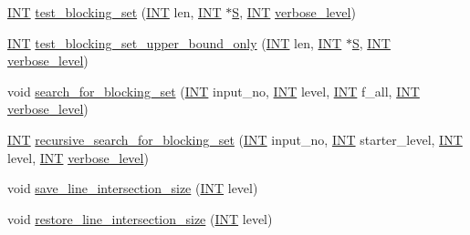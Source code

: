 \begin{DoxyCompactItemize}
\item 
\mbox{\hyperlink{galois_8h_a09fddde158a3a20bd2dcadb609de11dc}{I\+NT}} \mbox{\hyperlink{classsearch__blocking__set_a40f8e6200ebf133284aef437dfc4204e}{test\+\_\+blocking\+\_\+set}} (\mbox{\hyperlink{galois_8h_a09fddde158a3a20bd2dcadb609de11dc}{I\+NT}} len, \mbox{\hyperlink{galois_8h_a09fddde158a3a20bd2dcadb609de11dc}{I\+NT}} $\ast$\mbox{\hyperlink{simeon_8_c_adab47f8243f1b5a2c31df2535d6b37d0}{S}}, \mbox{\hyperlink{galois_8h_a09fddde158a3a20bd2dcadb609de11dc}{I\+NT}} \mbox{\hyperlink{simeon_8_c_a818073fbcc2f439e7c56952f67386122}{verbose\+\_\+level}})
\item 
\mbox{\hyperlink{galois_8h_a09fddde158a3a20bd2dcadb609de11dc}{I\+NT}} \mbox{\hyperlink{classsearch__blocking__set_ae1ec331b4fa4715c79a22bac0a71f146}{test\+\_\+blocking\+\_\+set\+\_\+upper\+\_\+bound\+\_\+only}} (\mbox{\hyperlink{galois_8h_a09fddde158a3a20bd2dcadb609de11dc}{I\+NT}} len, \mbox{\hyperlink{galois_8h_a09fddde158a3a20bd2dcadb609de11dc}{I\+NT}} $\ast$\mbox{\hyperlink{simeon_8_c_adab47f8243f1b5a2c31df2535d6b37d0}{S}}, \mbox{\hyperlink{galois_8h_a09fddde158a3a20bd2dcadb609de11dc}{I\+NT}} \mbox{\hyperlink{simeon_8_c_a818073fbcc2f439e7c56952f67386122}{verbose\+\_\+level}})
\item 
void \mbox{\hyperlink{classsearch__blocking__set_aea252e95af01eb415908fafbe1875a52}{search\+\_\+for\+\_\+blocking\+\_\+set}} (\mbox{\hyperlink{galois_8h_a09fddde158a3a20bd2dcadb609de11dc}{I\+NT}} input\+\_\+no, \mbox{\hyperlink{galois_8h_a09fddde158a3a20bd2dcadb609de11dc}{I\+NT}} level, \mbox{\hyperlink{galois_8h_a09fddde158a3a20bd2dcadb609de11dc}{I\+NT}} f\+\_\+all, \mbox{\hyperlink{galois_8h_a09fddde158a3a20bd2dcadb609de11dc}{I\+NT}} \mbox{\hyperlink{simeon_8_c_a818073fbcc2f439e7c56952f67386122}{verbose\+\_\+level}})
\item 
\mbox{\hyperlink{galois_8h_a09fddde158a3a20bd2dcadb609de11dc}{I\+NT}} \mbox{\hyperlink{classsearch__blocking__set_a3e93fae9b44b862b29070a42fa8c48ef}{recursive\+\_\+search\+\_\+for\+\_\+blocking\+\_\+set}} (\mbox{\hyperlink{galois_8h_a09fddde158a3a20bd2dcadb609de11dc}{I\+NT}} input\+\_\+no, \mbox{\hyperlink{galois_8h_a09fddde158a3a20bd2dcadb609de11dc}{I\+NT}} starter\+\_\+level, \mbox{\hyperlink{galois_8h_a09fddde158a3a20bd2dcadb609de11dc}{I\+NT}} level, \mbox{\hyperlink{galois_8h_a09fddde158a3a20bd2dcadb609de11dc}{I\+NT}} \mbox{\hyperlink{simeon_8_c_a818073fbcc2f439e7c56952f67386122}{verbose\+\_\+level}})
\item 
void \mbox{\hyperlink{classsearch__blocking__set_ac6fb0a4694346d742cf11919c6de8e6a}{save\+\_\+line\+\_\+intersection\+\_\+size}} (\mbox{\hyperlink{galois_8h_a09fddde158a3a20bd2dcadb609de11dc}{I\+NT}} level)
\item 
void \mbox{\hyperlink{classsearch__blocking__set_a3c0e544bb6b87094c33144f742a8d0c2}{restore\+\_\+line\+\_\+intersection\+\_\+size}} (\mbox{\hyperlink{galois_8h_a09fddde158a3a20bd2dcadb609de11dc}{I\+NT}} level)
\end{DoxyCompactItemize}
